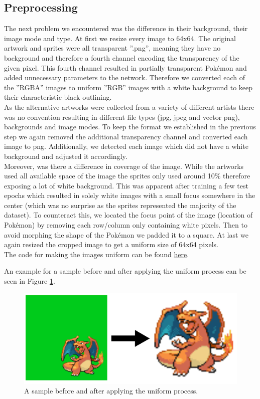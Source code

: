 \documentclass[12pt]{article}
\theoremstyle{plain}
\theoremstyle{definition}
\theoremstyle{remark}
\begin{document}
\subsection{Preprocessing}
The next problem we encountered was the difference in their background, their image mode and
type. At first we resize every image to 64x64. The original artwork and sprites were all transparent ”.png”, meaning they have no background and therefore a fourth channel encoding the transparency of the given pixel. This fourth channel resulted in partially transparent Pokémon and added unnecessary parameters to the network. Therefore we converted each of the ”RGBA”
images to uniform ”RGB” images with a white background to keep their characteristic black outlining. \\
As the alternative artworks were collected from a variety of different artists there was no convention resulting in different file types (jpg, jpeg and vector png), backgrounds and image modes.
To keep the format we established in the previous step we again removed the additional transparency channel and converted each image to png. Additionally, we detected each image which did not have a white background and adjusted it accordingly.\\
 Moreover, was there a difference
in coverage of the image. While the artworks used all available space of the image the sprites only used around 10\% therefore exposing a lot of white background. This was apparent after training a few test epochs which resulted in solely white images with a small focus somewhere in the center (which was no surprise as the sprites represented the majority of the dataset). To counteract this, we located the focus point of the image (location of Pokémon) by removing
each row/column only containing white pixels. Then to avoid morphing the shape of the Pokémon we padded it to a square. At last we again resized the cropped image to get a uniform size of 64x64 pixels.\\
The code for making the images uniform can be found \href{https://github.com/mhueppe/Diffusion_Models/blob/master/preprocessing/preprocessing_uniform_data.py}{here}.

An example for a sample before and after applying the uniform process can be seen in Figure \ref{fig:preprocessingpipeline}.

\begin{figure}[h]
	\centering
	\includegraphics[width=0.5\linewidth]{src/Images/preprocessing_pipeline}
	\caption[Before and After Uniform Process]{A sample before and after applying the uniform process.}
	\label{fig:preprocessingpipeline}
\end{figure}
\end{document}
